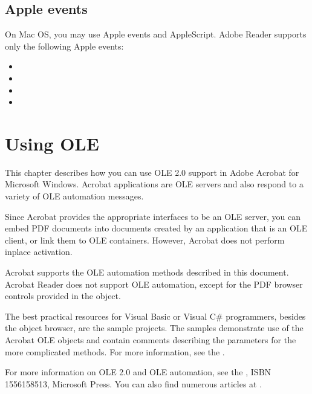 \documentclass[letterpaper,12pt,english,openany,oneside]{sphinxmanual}
\begin{document}
\section{Apple events}
\label{\detokenize{index:apple-events}}
On Mac OS, you may use Apple events and AppleScript. Adobe Reader supports only the following  Apple events:
\begin{itemize}
\item {} 

\item {} 

\item {} 

\item {} 

\end{itemize}


\chapter{Using OLE}
\label{\detokenize{IAC_DevApp_OLE_Support:using-ole}}\label{\detokenize{IAC_DevApp_OLE_Support::doc}}
This chapter describes how you can use OLE 2.0 support in Adobe Acrobat for Microsoft Windows. Acrobat applications are OLE servers and also respond to a variety of OLE automation messages.

Since Acrobat provides the appropriate interfaces to be an OLE server, you can embed PDF documents into documents created by an application that is an OLE client, or link them to OLE containers. However, Acrobat does not perform in\sphinxhyphen{}place activation.

Acrobat supports the OLE automation methods described in this document. Acrobat Reader does not support OLE automation, except for the PDF browser controls provided in the  object.

The best practical resources for Visual Basic or Visual C\# programmers, besides the object browser, are the sample projects. The samples demonstrate use of the Acrobat OLE objects and contain comments describing the parameters for the more complicated methods. For more information, see the  .

For more information on OLE 2.0 and OLE automation, see the  , ISBN 1\sphinxhyphen{}55615\sphinxhyphen{}851\sphinxhyphen{}3, Microsoft Press. You can also find numerous articles at  .
\end{document}
